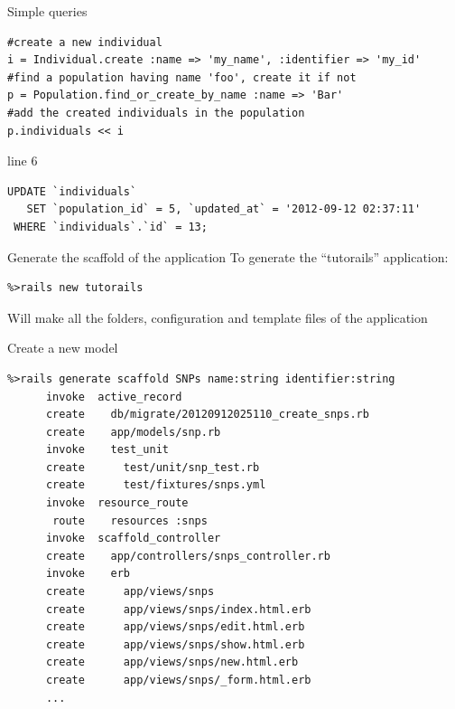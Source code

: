 \documentclass[12pt]{beamer}
\begin{document}
\begin{frame}[fragile]
  \begin{block}{Simple queries}
	\begin{verbatim}
#create a new individual
i = Individual.create :name => 'my_name', :identifier => 'my_id'
#find a population having name 'foo', create it if not
p = Population.find_or_create_by_name :name => 'Bar'
#add the created individuals in the population
p.individuals << i
	\end{verbatim}
  \end{block}
  
  \begin{block}{line 6}
  	\begin{verbatim}
UPDATE `individuals` 
   SET `population_id` = 5, `updated_at` = '2012-09-12 02:37:11' 
 WHERE `individuals`.`id` = 13;
  	\end{verbatim}
  \end{block}
\end{frame}


\begin{frame}[fragile]
  \begin{block}{Generate the scaffold of the application}
  	To generate the ``tutorails'' application:
	\begin{verbatim}
%>rails new tutorails
	\end{verbatim}
	Will make all the folders, configuration and template files of the application 
  \end{block}
\end{frame}

\begin{frame}[fragile]
  \begin{block}{Create a new model}
	\begin{verbatim}
%>rails generate scaffold SNPs name:string identifier:string
      invoke  active_record
      create    db/migrate/20120912025110_create_snps.rb
      create    app/models/snp.rb
      invoke    test_unit
      create      test/unit/snp_test.rb
      create      test/fixtures/snps.yml
      invoke  resource_route
       route    resources :snps
      invoke  scaffold_controller
      create    app/controllers/snps_controller.rb
      invoke    erb
      create      app/views/snps
      create      app/views/snps/index.html.erb
      create      app/views/snps/edit.html.erb
      create      app/views/snps/show.html.erb
      create      app/views/snps/new.html.erb
      create      app/views/snps/_form.html.erb
      ...
	\end{verbatim}
  \end{block}
\end{frame}
\end{document}

